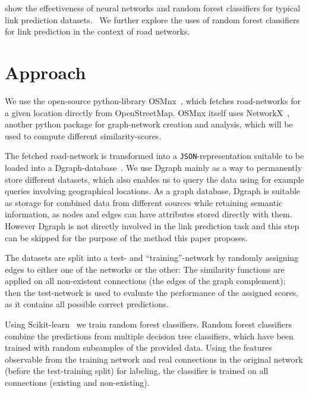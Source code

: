 \documentclass[12pt,a4paper]{IEEEtran}
\begin{document}
\citeauthor{machine_learning_link_prediction} show the effectiveness of
neural networks and random forest classifiers
for typical link prediction datasets.~\cite{machine_learning_link_prediction}
We further explore the uses of random forest classifiers for link prediction
in the context of road networks.

\section{Approach}

We use the open-source python-library OSMnx~\cite{osmnx}, which fetches
road-networks for a given location directly from OpenStreetMap.
OSMnx itself uses NetworkX~\cite{networkx}, another python package for graph-network creation and analysis,
which will be used to compute different similarity-scores.

The fetched road-network is transformed into a \texttt{JSON}-representation suitable to be
loaded into a Dgraph-database~\cite{dgraph_paper}.
We use Dgraph mainly as a way to permanently store different datasets,
which also enables us to query the data using for example queries involving geographical locations.
As a graph database, Dgraph is suitable as storage for combined data from different sources while retaining semantic information,
as nodes and edges can have attributes stored directly with them.
However Dgraph is not directly involved in the link prediction task and
this step can be skipped for the purpose of the method this paper proposes.

The datasets are split into a test- and \enquote{training}-network by randomly assigning edges to
either one of the networks or the other:
The similarity functions are applied on all non-existent connections
(the edges of the graph complement); then
the test-network is used to evaluate the performance of the assigned scores,
as it contains all possible correct predictions.

Using Scikit-learn~\cite{scikit_learn} we train random forest classifiers.
Random forest classifiers combine the predictions from multiple decision tree classifiers,
which have been trained with random subsamples of the provided data.
Using the features observable from the training network and real connections in the original network
(before the test-training split) for labeling,
the classifier is trained on all connections (existing and non-existing).
\end{document}
